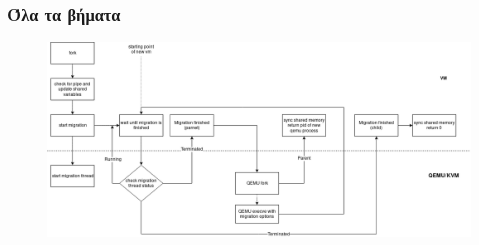 \documentclass[red,slidestop,notes,compress,mathserif]{beamer}
\begin{document}
\begin{frame}
\frametitle{Όλα τα βήματα}
\begin{figure}
\center
\includegraphics[scale=0.3]{figures/fork_olo1.png}
\end{figure}
\end{frame}
\end{document}
